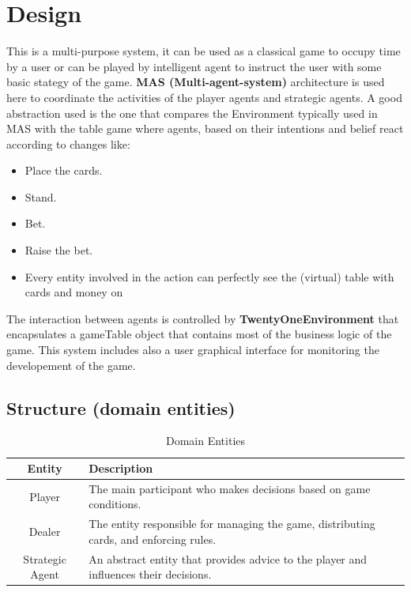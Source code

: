 \chapter{Design}

This is a multi-purpose system, it can be used as a classical game to occupy time by a user or can be played by intelligent agent to instruct the user with some basic stategy of the game. \textbf{MAS (Multi-agent-system)} architecture is used here to coordinate the activities of the player agents and strategic agents. A good abstraction used is the one that compares the Environment typically used in MAS with the table game where agents, based on their intentions and belief react according to changes like: 
\begin{itemize}
    \item Place the cards.
    \item Stand.
    \item Bet.
    \item Raise the bet.
    \item Every entity involved in the action can perfectly see the (virtual) table with cards and money on
 \end{itemize}

The interaction between agents is controlled by \textbf{TwentyOneEnvironment} that encapsulates a gameTable object that contains most of the business logic of the game. This system includes also a user graphical interface for monitoring the developement of the game.

\section{Structure (domain entities)}

\begin{table}[h]
    \centering
    \renewcommand{\arraystretch}{1.3}
    \begin{tabular}{|c|p{8cm}|}
        \hline
        \textbf{Entity} & \textbf{Description} \\
        \hline
        Player & The main participant who makes decisions based on game conditions. \\
        \hline
        Dealer & The entity responsible for managing the game, distributing cards, and enforcing rules. \\
        \hline
        Strategic Agent & An abstract entity that provides advice to the player and influences their decisions. \\
        \hline
    \end{tabular}
    \caption{Domain Entities}
    \label{tab:domain_entities}
\end{table}

